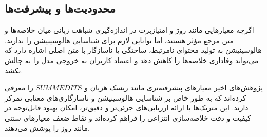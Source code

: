 \subsection{محدودیت‌ها و پیشرفت‌ها}

اگرچه معیارهایی مانند روژ و امتیازبرت در اندازه‌گیری شباهت زبانی میان خلاصه‌ها و متن مرجع مؤثر هستند، اما توانایی لازم برای شناسایی هالوسینیشن را ندارند. هالوسینیشن به تولید محتوای نامرتبط، ساختگی یا ناسازگار با متن اصلی اشاره دارد که می‌تواند وفاداری خلاصه‌ها را کاهش دهد و اعتماد کاربران به خروجی مدل را به چالش بکشد.


پژوهش‌های اخیر معیارهای پیشرفته‌تری مانند ریسک هزیان و $SUMMEDITS$ را معرفی کرده‌اند که به طور خاص بر شناسایی هالوسینیشن و ناسازگاری‌های معنایی تمرکز دارند. این متریک‌ها با ارائه ارزیابی‌های جزئی‌تر و دقیق‌تر، امکان بهبود قابل‌توجه در کیفیت و دقت خلاصه‌سازی انتزاعی را فراهم کرده‌اند و نقاط ضعف معیارهای سنتی مانند روژ را پوشش می‌دهند.










